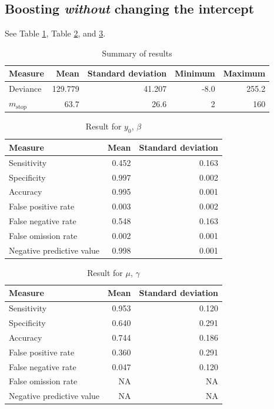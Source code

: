 \subsection{Boosting \textit{without} changing the intercept}
See Table \ref{table:non-correlated-no-intercept-summary}, Table \ref{table:non-correlated-no-intercept-y0}, and \ref{table:non-correlated-no-intercept-mu}.
\begin{table}\caption{Summary of results}\label{table:non-correlated-no-intercept-summary}
\begin{tabular}{l|rrrr}
Measure &    Mean &     Standard deviation &  Minimum & Maximum \\
\hline
Deviance & 129.779 & 41.207 & -8.0 & 255.2 \\
$m_{\text{stop}}$   &  63.7 & 26.6 &  2 & 160 \\
\end{tabular}
\end{table}

\begin{table}\caption{Result for $y_0$, $\beta$}\label{table:non-correlated-no-intercept-y0}
\begin{tabular}{l|rr}
Measure &  Mean &    Standard deviation \\
\hline
Sensitivity & 0.452 & 0.163 \\
Specificity & 0.997 & 0.002 \\
Accuracy    & 0.995 & 0.001 \\
False positive rate         & 0.003 & 0.002 \\
False negative rate         & 0.548 & 0.163 \\
False omission rate         & 0.002 & 0.001 \\
Negative predictive value         & 0.998 & 0.001
\end{tabular}
\end{table}


\begin{table}\caption{Result for $\mu$, $\gamma$}\label{table:non-correlated-no-intercept-mu}
\begin{tabular}{l|rr}
Measure &  Mean & Standard deviation \\
\hline
Sensitivity & 0.953 & 0.120 \\
Specificity & 0.640 & 0.291 \\
Accuracy    & 0.744 & 0.186 \\
False positive rate         & 0.360 & 0.291 \\
False negative rate         & 0.047 & 0.120 \\
False omission rate         &    NA &    NA \\
Negative predictive value         &    NA &    NA \\
\end{tabular}
\end{table}
